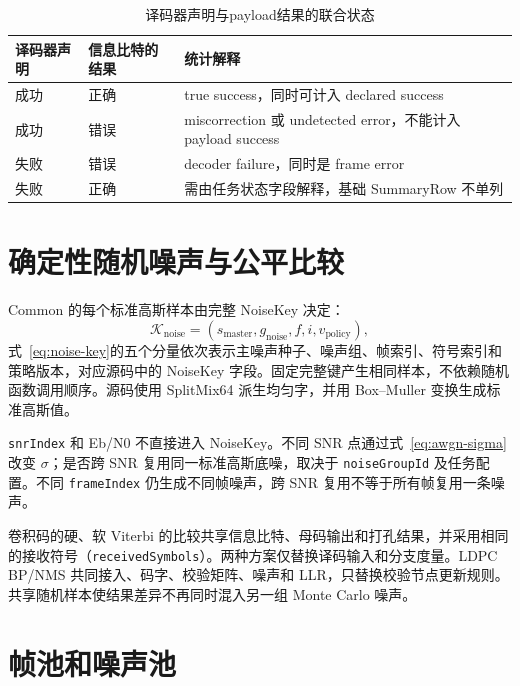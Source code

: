 \begin{table}[htbp]
  \centering
  \small
  \caption{译码器声明与payload结果的联合状态}
  \label{tab:decoder-status}
  \begin{tabular}{p{}p{}p{}}
    \toprule
    译码器声明 & 信息比特的结果 & 统计解释 \\
    \midrule
    成功 & 正确 & true success，同时可计入 declared success \\
    成功 & 错误 & miscorrection 或 undetected error，不能计入 payload success \\
    失败 & 错误 & decoder failure，同时是 frame error \\
    失败 & 正确 & 需由任务状态字段解释，基础 SummaryRow 不单列 \\
    \bottomrule
  \end{tabular}
\end{table}

\section{确定性随机噪声与公平比较}

Common 的每个标准高斯样本由完整 NoiseKey 决定：
\begin{equation}
  \mathcal{K}_{\mathrm{noise}}=
  (s_{\mathrm{master}},g_{\mathrm{noise}},f,i,v_{\mathrm{policy}}),
  \label{eq:noise-key}
\end{equation}
式~\eqref{eq:noise-key}的五个分量依次表示主噪声种子、噪声组、帧索引、符号索引和策略版本，对应源码中的 NoiseKey 字段。固定完整键产生相同样本，不依赖随机函数调用顺序。源码使用 SplitMix64 派生均匀字，并用 Box--Muller 变换生成标准高斯值。

\texttt{snrIndex} 和 Eb/N0 不直接进入 NoiseKey。不同 SNR 点通过式~\eqref{eq:awgn-sigma}改变 $\sigma$；是否跨 SNR 复用同一标准高斯底噪，取决于 \texttt{noiseGroupId} 及任务配置。不同 \texttt{frameIndex} 仍生成不同帧噪声，跨 SNR 复用不等于所有帧复用一条噪声。

卷积码的硬、软 Viterbi 的比较共享信息比特、母码输出和打孔结果，并采用相同的接收符号（\texttt{receivedSymbols}）。两种方案仅替换译码输入和分支度量。LDPC BP/NMS 共同接入、码字、校验矩阵、噪声和 LLR，只替换校验节点更新规则。共享随机样本使结果差异不再同时混入另一组 Monte Carlo 噪声。

\section{帧池和噪声池}

